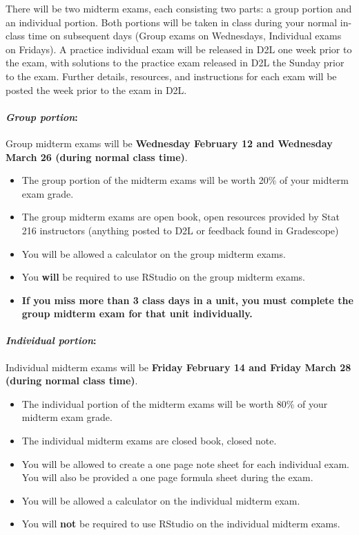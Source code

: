 \documentclass[
]{article}
\providecommand{\tightlist}{%
  \setlength{\itemsep}{0pt}\setlength{\parskip}{0pt}}
\begin{document}
There will be two midterm exams, each consisting two parts: a group
portion and an individual portion. Both portions will be taken in class
during your normal in-class time on subsequent days (Group exams on
Wednesdays, Individual exams on Fridays). A practice individual exam
will be released in D2L one week prior to the exam, with solutions to
the practice exam released in D2L the Sunday prior to the exam. Further
details, resources, and instructions for each exam will be posted the
week prior to the exam in D2L.

\paragraph{\texorpdfstring{\emph{Group
portion}:}{Group portion:}}\label{group-portion}

Group midterm exams will be \textbf{Wednesday February 12 and Wednesday
March 26 (during normal class time)}.

\begin{itemize}
\tightlist
\item
  The group portion of the midterm exams will be worth 20\% of your
  midterm exam grade.
\item
  The group midterm exams are open book, open resources provided by Stat
  216 instructors (anything posted to D2L or feedback found in
  Gradescope)
\item
  You will be allowed a calculator on the group midterm exams.
\item
  You \textbf{will} be required to use RStudio on the group midterm
  exams.
\item
  \textbf{If you miss more than 3 class days in a unit, you must
  complete the group midterm exam for that unit individually.}
\end{itemize}

\paragraph{\texorpdfstring{\emph{Individual
portion}:}{Individual portion:}}\label{individual-portion}

Individual midterm exams will be \textbf{Friday February 14 and Friday
March 28 (during normal class time)}.

\begin{itemize}
\tightlist
\item
  The individual portion of the midterm exams will be worth 80\% of your
  midterm exam grade.
\item
  The individual midterm exams are closed book, closed note.
\item
  You will be allowed to create a one page note sheet for each
  individual exam. You will also be provided a one page formula sheet
  during the exam.
\item
  You will be allowed a calculator on the individual midterm exam.
\item
  You will \textbf{not} be required to use RStudio on the individual
  midterm exams.
\end{itemize}
\end{document}
